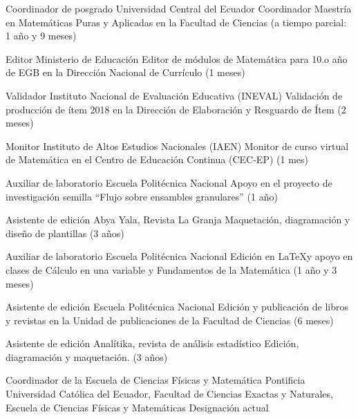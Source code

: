 \documentclass[
	a4paper,
	maincolor=cvblue!70!blue,
	sidecolor=gray!30,
	sectioncolor=cvblue!70!blue,
    sidebarwidth=7.5cm,
	topbottommargin=20pt,
	leftrightmargin=20pt,
]{fortysecondscv}
\begin{document}

    {Coordinador de posgrado}
    {Universidad Central del Ecuador}
    {Coordinador Maestría en Matemáticas Puras y Aplicadas en la Facultad de Ciencias (a tiempo parcial: 1 año y 9 meses)}

    {Editor}
    {Ministerio de Educación}
    {Editor de módulos de Matemática para 10.o año de EGB en la Dirección Nacional de Currículo (1 meses)}

    {Validador}
    {Instituto Nacional de Evaluación Educativa (INEVAL)}
    {Validación de producción de ítem 2018 en la Dirección de Elaboración y Resguardo de Ítem (2 meses)}

    {Monitor}
    {Instituto de Altos Estudios Nacionales (IAEN)}
    {Monitor de curso virtual de Matemática en el Centro de Educación Continua (CEC-EP) (1 mes)}

    {Auxiliar de laboratorio}
    {Escuela Politécnica Nacional}
    {Apoyo en el proyecto de investigación semilla ``Flujo sobre ensambles granulares'' (1 año)}

    {Asistente de edición}
    {Abya Yala, Revista La Granja}
    {Maquetación, diagramación y diseño de plantillas (3 años)}

    {Auxiliar de laboratorio}
    {Escuela Politécnica Nacional}
    {Edición en \LaTeX y apoyo en clases de Cálculo en una variable y Fundamentos de la Matemática (1 año y 3 meses)}

    {Asistente de edición}
    {Escuela Politécnica Nacional}
    {Edición y publicación de libros y revistas en la Unidad de publicaciones de la Facultad de Ciencias (6 meses)}

    {Asistente de edición}
    {Analítika, revista de análisis estadístico}
    {Edición, diagramación y maquetación. (3 años)}


\makebacksidebar


    {Coordinador de la Escuela de Ciencias Físicas y Matemática}
    {Pontificia Universidad Católica del Ecuador, Facultad de Ciencias Exactas y Naturales, Escuela de Ciencias Físicas y Matemáticas}
    {Designación actual}
    
\end{document}
